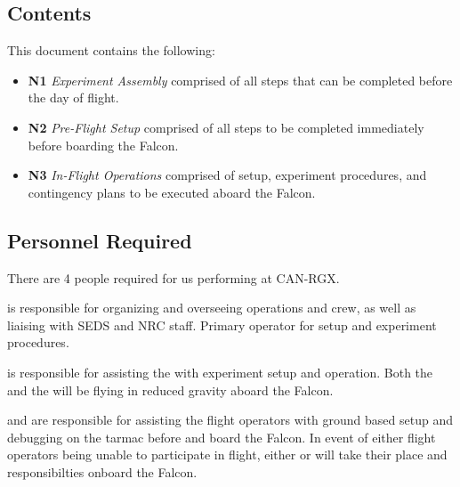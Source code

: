 \subsection{Contents}
This document contains the following:
\begin{itemize}
    \item \textbf{N1} \textit{Experiment Assembly} comprised of all steps that can be completed before the day of flight.
    \item \textbf{N2} \textit{Pre-Flight Setup} comprised of all steps to be completed immediately before boarding the Falcon.
    \item \textbf{N3} \textit{In-Flight Operations} comprised of setup, experiment procedures, and contingency plans to be executed aboard the Falcon.
\end{itemize}

\subsection{Personnel Required}
There are 4 people required for us performing at CAN-RGX.
\begin{checklist}
    \item \commanderfull{} is responsible for organizing and overseeing operations and crew, as well as liaising with SEDS and NRC staff. Primary operator for setup and experiment procedures.
    \item \payloadfull{} is responsible for assisting the \commander{} with experiment setup and operation. Both the \payload{} and the \commander{} will be flying in reduced gravity aboard the Falcon.
    \item \mspecprifull{} and \mspecsecfull{} are responsible for assisting the flight operators with ground based setup and debugging on the tarmac before \commander{} and \payload{} board the Falcon. In event of either flight operators being unable to participate in flight, either \mspecpri{} or \mspecsec{} will take their place and responsibilties onboard the Falcon.
\end{checklist}
\setcounter{checklistnum}{0}

